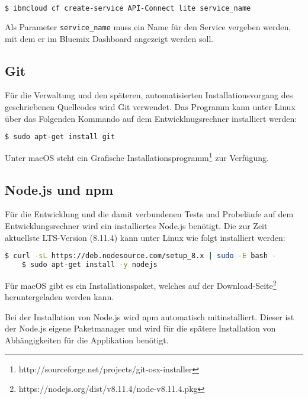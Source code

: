 \begin{lstlisting}[language=bash, caption=Instanziierung von API Connect, label=Instanziierung von API Connect]
$ ibmcloud cf create-service API-Connect lite service_name
\end{lstlisting}

Als Parameter \texttt{service\_name} muss ein Name für den Service vergeben werden, mit dem er im Bluemix Dashboard angezeigt
werden soll.

\subsection{Git}
Für die Verwaltung und den späteren, automatisierten Installationsvorgang des geschriebenen Quellcodes wird Git verwendet.
Das Programm kann unter Linux über das Folgenden Kommando auf dem Entwicklnugsrechner installiert werden:

\begin{lstlisting}[language=bash, caption=Installation von Git, label=Installation von Git]
    $ sudo apt-get install git
\end{lstlisting}

Unter macOS steht ein Grafische Installationsprogramm\footnote{http://sourceforge.net/projects/git-osx-installer} zur
Verfügung.

\subsection{Node.js und npm}
Für die Entwicklung und die damit verbundenen Tests und Probeläufe auf dem Entwicklungsrechner wird ein installiertes
Node.js benötigt. Die zur Zeit aktuellste LTS-Version (8.11.4) kann unter Linux wie folgt installiert werden:

\begin{lstlisting}[language=bash, caption=Installation von Node.js, label=Installation von Node.js]
    $ curl -sL https://deb.nodesource.com/setup_8.x | sudo -E bash -
    $ sudo apt-get install -y nodejs
\end{lstlisting}

Für macOS gibt es ein Installationspaket, welches auf der Download-Seite\footnote{https://nodejs.org/dist/v8.11.4/node-v8.11.4.pkg}
heruntergeladen werden kann.

Bei der Installation von Node.js wird npm automatisch mitinstalliert. Dieser ist der Node.js eigene Paketmanager und wird
für die spätere Installation von Abhängigkeiten für die Applikation benötigt.